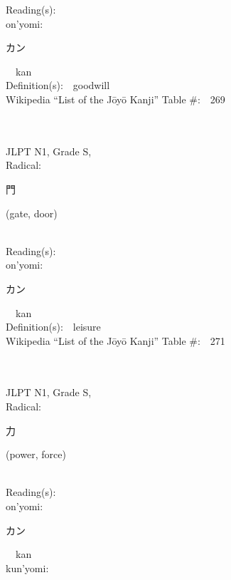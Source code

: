 \begin{multicols}{2}
Reading(s):\ \ \\
{\hspace*{1em}}on'yomi:\ \ \\
{\hspace*{2em}}{\begin{CJK}{UTF8}{min} カン \end{CJK}}\ \ kan\ \ \\
Definition(s):\ \ goodwill \\
Wikipedia ``List of the J\=oy\=o Kanji'' Table \#:\ \ 269 \\
\ \ \\
{\fontsize{34pt}{40pt}  }\ \ \\
{JLPT N1, Grade S, \\Radical:\ \ {\begin{CJK}{UTF8}{min} 門 \end{CJK}} (gate, door) } \\
Reading(s):\ \ \\
{\hspace*{1em}}on'yomi:\ \ \\
{\hspace*{2em}}{\begin{CJK}{UTF8}{min} カン \end{CJK}}\ \ kan\ \ \\
Definition(s):\ \ leisure \\
Wikipedia ``List of the J\=oy\=o Kanji'' Table \#:\ \ 271 \\
\ \ \\
{\fontsize{34pt}{40pt}  }\ \ \\
{JLPT N1, Grade S, \\Radical:\ \ {\begin{CJK}{UTF8}{min} 力 \end{CJK}} (power, force) } \\
Reading(s):\ \ \\
{\hspace*{1em}}on'yomi:\ \ \\
{\hspace*{2em}}{\begin{CJK}{UTF8}{min} カン \end{CJK}}\ \ kan\ \ \\
{\hspace*{1em}}kun'yomi:\ \ \\

\end{multicols}
